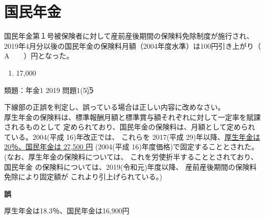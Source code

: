 \section{国民年金}

\begin{fillblank}[自作 2026/11/1]
国民年金第１号被保険者に対して産前産後期間の保険料免除制度が施行され、
2019年4月分以後の国民年金の保険料月額（2004年度水準）は100円引き上がり（　　A　　）円となった。
\end{fillblank}

\begin{answerbox}
  \begin{enumerate}[A: ]
    \item 17,000
  \end{enumerate}
\end{answerbox}

\begin{explanationbox}
類題：年金1 2019 問題1(5)\textcircled{5}
\end{explanationbox}


\begin{truefalse}[年金2 2024 問題1(1)オ]
  下線部の正誤を判定し、誤っている場合は正しい内容に改めなさい。
  \\

厚生年金の保険料は、標準報酬月額と標準賞与額それぞれに対して一定率を賦課されるものとして
定められており、国民年金の保険料は、月額として定められている。2004(平成 16)年改正では、
これらを 2017(平成 29)年以降、\underline{厚生年金は 20％、国民年金は 27,500 円}
(2004(平成 16)年度価格)で固定することとされた。 (なお、厚生年金の保険料については、
これを労使折半することとされており、国民年金 の保険料については、2019(令和元)年度以降、
産前産後期間の保険料免除により固定額が これより引上げられている。)
\end{truefalse}

\begin{answerbox}
  \textbf{誤}

厚生年金は18.3％、国民年金は16,900円
\end{answerbox}

